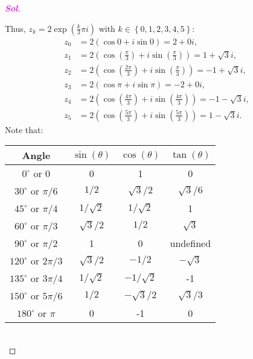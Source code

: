 \documentclass{article}
\theoremstyle{definition}
\newcommand{\set}[1]{\left\{#1\right\}}
\newcommand{\of}[1]{\left( #1 \right)}
\newcommand{\sol}{\textcolor{magenta}{\bf Sol}}
\begin{document}
\begin{enumerate}
\begin{proof}[\sol]
\begin{center}
		\end{center}
		Thus, $z_k=2\exp\of{\frac{k}{3}\pi i}$ with $k\in\set{0,1,2,3,4,5}:$\begin{align*}
			z_0&=2\of{\cos 0+i\sin 0}=2+0i,\\
			z_1&=2\of{\cos\of{\frac{\pi}{3}}+i\sin\of{\frac{\pi}{3}}}=1+\sqrt{3}i,\\
			z_2&=2\of{\cos\of{\frac{2\pi}{3}}+i\sin\of{\frac{\pi}{3}}}=-1+\sqrt{3}i,\\
			z_3&=2\of{\cos\pi+i\sin\pi}=-2+0i,\\
			z_4&=2\of{\cos\of{\frac{4\pi}{3}}+i\sin\of{\frac{4\pi}{3}}}=-1-\sqrt{3}i,\\
			z_5&=2\of{\cos\of{\frac{5\pi}{3}}+i\sin\of{\frac{5\pi}{3}}}=1-\sqrt{3}i.
		\end{align*}
		Note that: \begin{table}[ht!]
			\centering
			\begin{tabular}{c||c|c|c}
				\toprule
				Angle & $\sin(\theta)$ & $\cos(\theta)$ & $\tan(\theta)$ \\
				\midrule
				$0^\circ$ or $0$ & 0 & 1 & 0 \\
				$30^\circ$ or ${\pi}/{6}$ & ${1}/{2}$ & ${\sqrt{3}}/{2}$ & ${\sqrt{3}}/{6}$ \\
				$45^\circ$ or ${\pi}/{4}$ & ${1}/{\sqrt{2}}$ & ${1}/{\sqrt{2}}$ & 1 \\
				$60^\circ$ or ${\pi}/{3}$ & ${\sqrt{3}}/{2}$ & ${1}/{2}$ & $\sqrt{3}$ \\
				$90^\circ$ or ${\pi}/{2}$ & 1 & 0 & undefined \\
				$120^\circ$ or ${2\pi}/{3}$ & ${\sqrt{3}}/{2}$ & $-{1}/{2}$ & $-\sqrt{3}$ \\
				$135^\circ$ or ${3\pi}/{4}$ & ${1}/{\sqrt{2}}$ & $-{1}/{\sqrt{2}}$ & -1 \\
				$150^\circ$ or ${5\pi}/{6}$ & ${1}/{2}$ & $-{\sqrt{3}}/{2}$ & ${\sqrt{3}}/{3}$ \\
				$180^\circ$ or $\pi$ & 0 & -1 & 0 \\
				\bottomrule
			\end{tabular}
		\end{table}\\
	\end{proof}
	\vspace{8pt}

\end{enumerate}
\end{document}
